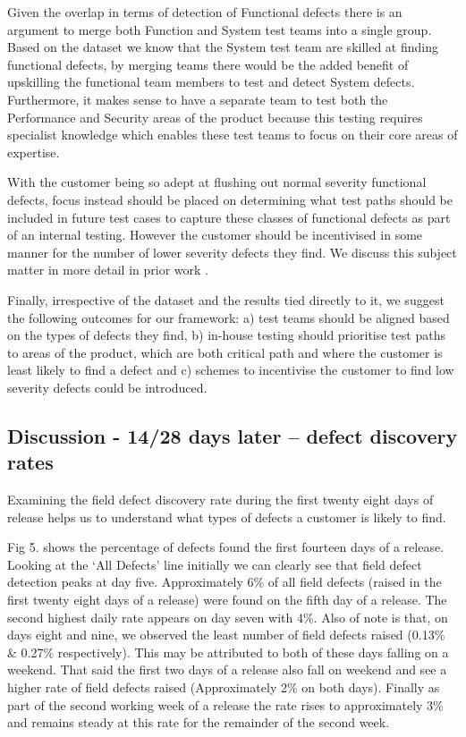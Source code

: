 Given the overlap in terms of detection of Functional defects there is an argument to merge both Function and System test teams into a single group. Based on the dataset we know that the System test team are skilled at finding functional defects, by merging teams there would be the added benefit of upskilling the functional team members to test and detect System defects. Furthermore, it makes sense to have a separate team to test both the Performance and Security areas of the product because this testing requires specialist knowledge which enables these test teams to focus on their core areas of expertise. \par

With the customer being so adept at flushing out normal severity functional defects, focus instead should be placed on determining what test paths should be included in future test cases to capture these classes of functional defects as part of an internal testing. However the customer should be incentivised in some manner for the number of lower severity defects they find. We discuss this subject matter in more detail in prior work \cite{7331827}.

Finally, irrespective of the dataset and the results tied directly to it, we suggest the following outcomes for our framework: a) test teams should be aligned based on the types of defects they find, b) in-house testing should prioritise test paths to areas of the product, which are both critical path and where the customer is least likely to find a defect and c) schemes to incentivise the customer to find low severity defects could be introduced. \par

\subsection{Discussion - 14/28 days later -- defect discovery rates}

Examining the field defect discovery rate during the first twenty eight days of release helps us to understand what types of defects a customer is likely to find. \par 

Fig 5. shows the percentage of defects found the first fourteen days of a release. Looking at the
`All Defects' line initially we can clearly see that field defect detection peaks at day five. Approximately 6\% of all field
defects (raised in the first twenty eight days of a release) were found on the fifth day of a release. The second highest
daily rate appears on day seven with 4\%. Also of note is that, on days eight and nine, we observed the least number
of field defects raised (0.13\% \& 0.27\% respectively). This may be attributed to both of these days falling on a weekend. That said the first two days of a release also fall on weekend and see a higher rate of field defects raised (Approximately 2\% on both days). Finally as part of the second working week of a release the rate rises to approximately 3\% and remains steady at this rate for the remainder of the second week. \par 

